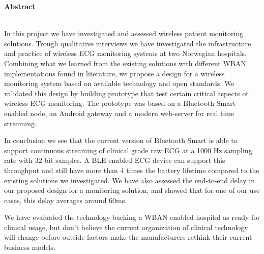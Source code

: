 \thispagestyle{empty}
\noindent \textbf{Abstract}\\
\newline


\\
\newline	
\noindent
In this project we have investigated and assessed wireless patient monitoring solutions. Trough qualitative interviews we have investigated the infrastructure and practice of wireless ECG monitoring systems at two Norwegian hospitals. Combining what we learned from the existing solutions with different WBAN implementations found in literature, we propose a design for a wireless monitoring system based on available technology and open standards. We validated this design by building prototype that test certain critical aspects of wireless ECG monitoring. The prototype was based on a Bluetooth Smart enabled node, an Android gateway and a modern web-server for real time streaming.

In conclusion we see that the current version of Bluetooth Smart is able to support continuous streaming of clinical grade raw ECG at a 1000 Hz sampling rate with 32 bit samples. A BLE enabled ECG device can support this throughput and still have more than 4 times the battery lifetime compared to the existing solutions we investigated. We have also assessed the end-to-end delay in our proposed design for a monitoring solution, and showed that for one of our use cases, this delay averages around 60ms.

We have evaluated the technology backing a WBAN enabled hospital as ready for clinical usage, but don't believe the current organization of clinical technology will change before outside factors make the manufacturers rethink their current business models. 